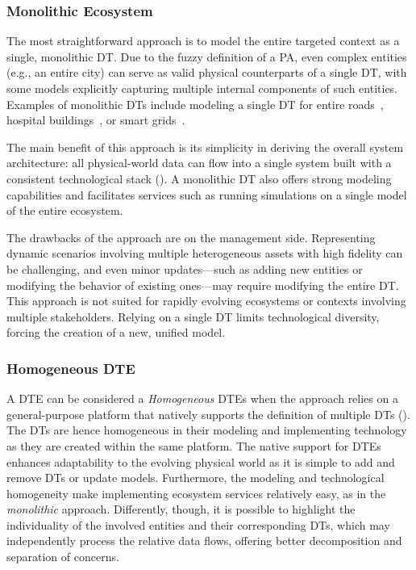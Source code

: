 \subsubsection{Monolithic Ecosystem}
\label{sssec:monolithic}

The most straightforward approach is to model the entire targeted context as a single, monolithic \ac{DT}.
Due to the fuzzy definition of a \ac{PA}, even complex entities (e.g., an entire city) can serve as valid physical counterparts of a single \ac{DT}, with some models explicitly capturing multiple internal components of such entities. Examples of monolithic \acp{DT} include modeling a single \ac{DT} for entire roads~\cite{KUSIC2023101858}, hospital buildings~\cite{Peng_Zhang_Yu_Xu_Gao_2020}, or smart grids~\cite{9449682}.

The main benefit of this approach is its simplicity in deriving the overall system architecture:
all physical-world data can flow into a single system built with a consistent technological stack ().
%
A monolithic \ac{DT} also offers strong modeling capabilities and facilitates services such as running simulations on a single model of the entire ecosystem.

The drawbacks of the approach are on the management side. 
Representing dynamic scenarios involving multiple heterogeneous assets with high fidelity can be challenging, and even minor updates---such as adding new entities or modifying the behavior of existing ones---may require modifying the entire \ac{DT}.
%
This approach is not suited for rapidly evolving ecosystems or contexts involving multiple stakeholders.
%
Relying on a single \ac{DT} limits technological diversity, forcing the creation of a new, unified model.


\subsubsection{Homogeneous \ac{DTE}}
\label{sssec:homogeneous}

A \ac{DTE} can be considered a \emph{Homogeneous} \acp{DTE} when the approach relies on a general-purpose platform that natively supports the definition of multiple \acp{DT} ().
%
The \acp{DT} are hence homogeneous in their modeling and implementing technology as they are created within the same platform.
%
The native support for \acp{DTE} enhances adaptability to the evolving physical world as it is simple to add and remove \acp{DT} or update models.
%
Furthermore, the modeling and technological homogeneity make implementing ecosystem services relatively easy, as in the \emph{monolithic} approach.
%
Differently, though, it is possible to highlight the individuality of the involved entities and their corresponding \acp{DT}, which may independently process the relative data flows, offering better decomposition and separation of concerns.

